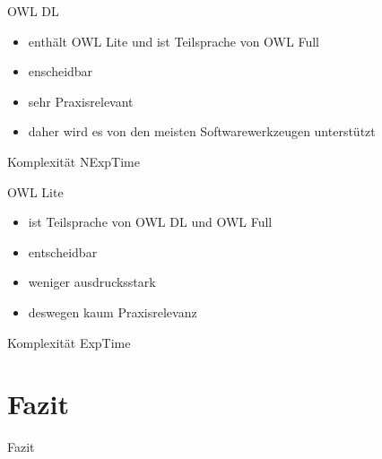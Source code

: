 \documentclass{beamer}
\begin{document}
%
\begin{frame}{OWL DL}
\begin{itemize}
	\item enthält OWL Lite und ist Teilsprache von OWL Full
	\item enscheidbar
	\item sehr Praxisrelevant
	\item daher wird es von den meisten Softwarewerkzeugen unterstützt
\end{itemize}
\begin{block}{Komplexität}
	NExpTime
\end{block}
\end{frame}

%
\begin{frame}{OWL Lite}
\begin{itemize}
	\item ist Teilsprache von OWL DL und OWL Full
	\item entscheidbar
	\item weniger ausdrucksstark
	\item deswegen kaum Praxisrelevanz
\end{itemize}
\begin{block}{Komplexität}
	ExpTime
\end{block}
\end{frame}


\section{Fazit}
\begin{frame}{Fazit}
\end{frame}
\end{document}
